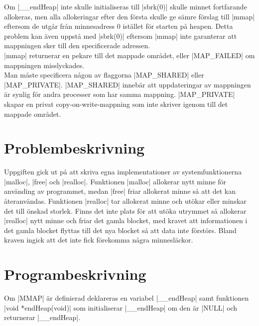 \documentclass[paper=a4, fontsize=11pt]{scrartcl} %
\numberwithin{equation}{section} %
\numberwithin{figure}{section} %
\numberwithin{table}{section} %
\begin{document}
Om |__endHeap| inte skulle initialiseras till |sbrk(0)| skulle minnet fortfarande
allokeras, men alla allokeringar efter den första skulle ge sämre förslag till
|mmap| eftersom de utgår från minnesadress 0 istället för starten på heapen.
Detta problem kan även uppstå med |sbrk(0)| eftersom |mmap| inte garanterar att
mappningen sker till den specificerade adressen.\\

|mmap| returnerar en pekare till det mappade området, eller |MAP_FAILED| om
mappningen misslyckades.\\

Man måste specificera någon av flaggorna |MAP_SHARED| eller |MAP_PRIVATE|.
|MAP_SHARED| innebär att uppdateringar av mappningen är synlig för andra
processer som har samma mappning.
|MAP_PRIVATE| skapar en privat copy-on-write-mappning som inte skriver igenom
till det mappade området.

\section{Problembeskrivning}
Uppgiften gick ut på att skriva egna implementationer av systemfunktionerna
|malloc|, |free| och |realloc|.
Funktionen |malloc| allokerar nytt minne för använding av programmet, medan
|free| friar allokerat minne så att det kan återanvändas.
Funktionen |realloc| tar allokerat minne och utökar eller minskar det till
önskad storlek.
Finns det inte plats för att utöka utrymmet så allokerar |realloc| nytt minne
och friar det gamla blocket, med kravet att informationen i det gamla blocket
flyttas till det nya blocket så att data inte förstörs.
Bland kraven ingick att det inte fick förekomma några minnesläckor.



\section{Programbeskrivning}

%
%
Om |MMAP| är definierad deklareras en variabel |__endHeap| samt funktionen 
|void *endHeap(void)| som initialiserar |__endHeap| om den är |NULL| och
returnerar |__endHeap|.\\
\end{document}
